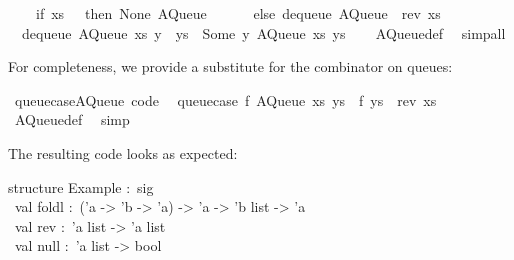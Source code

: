 \begin{isabellebody}
\ \ \ \ {\isacharparenleft}if\ xs\ {\isacharequal}\ {\isacharbrackleft}{\isacharbrackright}\ then\ {\isacharparenleft}None{\isacharcomma}\ AQueue\ {\isacharbrackleft}{\isacharbrackright}\ {\isacharbrackleft}{\isacharbrackright}{\isacharparenright}\isanewline
\ \ \ \ else\ dequeue\ {\isacharparenleft}AQueue\ {\isacharbrackleft}{\isacharbrackright}\ {\isacharparenleft}rev\ xs{\isacharparenright}{\isacharparenright}{\isacharparenright}{\isachardoublequoteclose}\isanewline
\ \ {\isachardoublequoteopen}dequeue\ {\isacharparenleft}AQueue\ xs\ {\isacharparenleft}y\ {\isacharhash}\ ys{\isacharparenright}{\isacharparenright}\ {\isacharequal}\ {\isacharparenleft}Some\ y{\isacharcomma}\ AQueue\ xs\ ys{\isacharparenright}{\isachardoublequoteclose}\isanewline
\ \ \isamarkupfalse%
\ AQueue{\isacharunderscore}def\ \isamarkupfalse%
\ simp{\isacharunderscore}all%
\endisatagquote
{\isafoldquote}%
%
\isadelimquote
%
\endisadelimquote
%
\begin{isamarkuptext}%
\noindent For completeness, we provide a substitute for the
   combinator on queues:%
\end{isamarkuptext}%
\isamarkuptrue%
%
\isadelimquote
%
\endisadelimquote
%
\isatagquote
{}\isamarkupfalse%
\ queue{\isacharunderscore}case{\isacharunderscore}AQueue\ {\isacharbrackleft}code{\isacharbrackright}{\isacharcolon}\isanewline
\ \ {\isachardoublequoteopen}queue{\isacharunderscore}case\ f\ {\isacharparenleft}AQueue\ xs\ ys{\isacharparenright}\ {\isacharequal}\ f\ {\isacharparenleft}ys\ {\isacharat}\ rev\ xs{\isacharparenright}{\isachardoublequoteclose}\isanewline
\ \ \isamarkupfalse%
\ AQueue{\isacharunderscore}def\ \isamarkupfalse%
\ simp%
\endisatagquote
{\isafoldquote}%
%
\isadelimquote
%
\endisadelimquote
%
\begin{isamarkuptext}%
\noindent The resulting code looks as expected:%
\end{isamarkuptext}%
\isamarkuptrue%
%
\isadelimquote
%
\endisadelimquote
%
\isatagquote
%
\begin{isamarkuptext}%
\isatypewriter%
\noindent%
\hspace*{0pt}structure Example :~sig\\
\hspace*{0pt} ~val foldl :~('a -> 'b -> 'a) -> 'a -> 'b list -> 'a\\
\hspace*{0pt} ~val rev :~'a list -> 'a list\\
\hspace*{0pt} ~val null :~'a list -> bool\\

\end{isamarkuptext}
\end{isabellebody}
